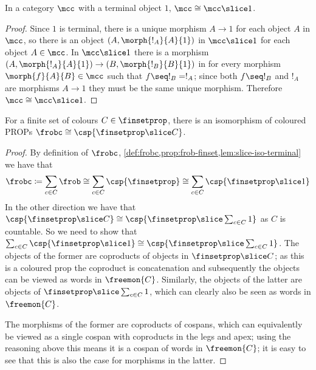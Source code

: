 \begin{lemma}
    \label{lem:slice-iso-terminal}
    In a category \(\mcc\) with a terminal object \(1\),
    \(\mcc \cong \mcc \slice 1\).
\end{lemma}
\begin{proof}
    Since \(1\) is terminal, there is a unique morphism \(A \to 1\) for each
    object \(A\) in \(\mcc\), so there is an object \((A, \morph{!_A}{A}{1})\)
    in \(\mcc \slice 1\) for each object \(A \in \mcc\).
    In \(\mcc \slice 1\) there is a morphism
    \((A, \morph{!_A}{A}{1}) \to (B, \morph{!_B}{B}{1})\) in
    for every morphism \(\morph{f}{A}{B} \in \mcc\) such
    that \(f \seq !_B = !_A\); since both \(f \seq !_B\) and \(!_A\) are
    morphisms \(A \to 1\) they must be the same unique morphism.
    Therefore \(\mcc \cong \mcc \slice 1\).
\end{proof}

\begin{theorem}
    \label{thm:frobc-iso-finset-slice-c}
    For a finite set of colours \(C \in \finsetprop\), there is an isomorphism
    of coloured PROPs \(\frobc \cong \csp{\finsetprop \slice C}\).
\end{theorem}
\begin{proof}
    By definition of \(\frobc\),
    \cref{def:frobc,prop:frob-finset,lem:slice-iso-terminal}
    we have that \[
        \frobc
        \coloneqq
        \sum_{c \in C}\frob
        \cong
        \sum_{c \in C}\csp{\finsetprop}
        \cong
        \sum_{c \in C}\csp{\finsetprop \slice 1}
    \]
    In the other direction we have that \(
    \csp{\finsetprop \slice C}
    \cong
    \csp{\finsetprop \slice \sum_{c \in C} 1}
    \) as \(C\) is countable.
    So we need to show that \(
    \sum_{c \in C}\csp{\finsetprop \slice 1}
    \cong
    \csp{\finsetprop \slice \sum_{c \in C} 1}
    \).
    The objects of the former are coproducts of objects in
    \(\finsetprop \slice C\); as this is a coloured prop the coproduct is
    concatenation and subsequently the objects can be viewed as words in
    \(\freemon{C}\).
    Similarly, the objects of the latter are objects of
    \(\finsetprop \slice \sum_{c \in C} 1\), which can clearly also be
    seen as words in \(\freemon{C}\).

    The morphisms of the former are coproducts of cospans, which can
    equivalently be viewed as a single cospan with coproducts in the legs and
    apex; using the reasoning above this means it is a cospan of words in
    \(\freemon{C}\); it is easy to see that this is also the case for morphisms
    in the latter.
\end{proof}

